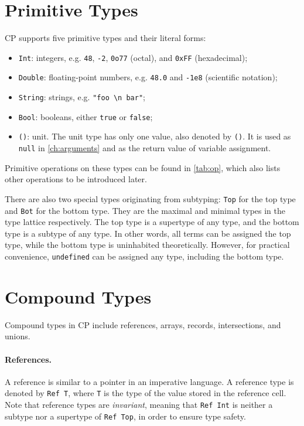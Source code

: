 \section{Primitive Types}

CP supports five primitive types and their literal forms: 
\begin{itemize}
\item \lstinline{Int}: integers, e.g. \lstinline{48}, \lstinline{-2}, \lstinline{0o77} (octal), and \lstinline{0xFF} (hexadecimal);
\item \lstinline{Double}: floating-point numbers, e.g. \lstinline{48.0} and \lstinline{-1e8} (scientific notation);
\item \lstinline{String}: strings, e.g. \lstinline{"foo \n bar"};
\item \lstinline{Bool}: booleans, either \lstinline{true} or \lstinline{false};
\item \lstinline{()}: unit. The unit type has only one value, also denoted by
      \lstinline{()}. It is used as \lstinline{null} in \autoref{ch:arguments}
      and as the return value of variable assignment.
\end{itemize}
Primitive operations on these types can be found in \autoref{tab:op}, which also
lists other operations to be introduced later.

There are also two special types originating from subtyping: \lstinline{Top} for
the top type and \lstinline{Bot} for the bottom type. They are the maximal and
minimal types in the type lattice respectively. The top type is a supertype of
any type, and the bottom type is a subtype of any type. In other words, all
terms can be assigned the top type, while the bottom type is uninhabited
theoretically. However, for practical convenience, \lstinline{undefined} can be
assigned any type, including the bottom type.

\section{Compound Types}

Compound types in CP include references, arrays, records, intersections, and
unions.

\paragraph{References.}
A reference is similar to a pointer in an imperative language. A reference type
is denoted by \lstinline{Ref T}, where \lstinline{T} is the type of the value
stored in the reference cell. Note that reference types are \emph{invariant},
meaning that \lstinline{Ref Int} is neither a subtype nor a supertype of
\lstinline{Ref Top}, in order to ensure type safety.

